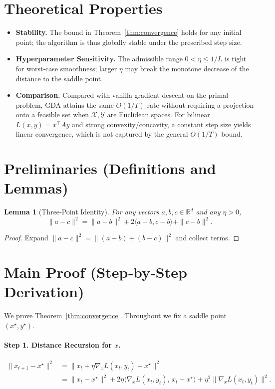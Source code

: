 \documentclass{article}
\newtheorem{lemma}{Lemma}
\begin{document}
\section*{Theoretical Properties}
\begin{itemize}[leftmargin=*]
\item \textbf{Stability.} The bound in Theorem~\ref{thm:convergence} holds for any initial point; the algorithm is thus globally stable under the prescribed step size.
\item \textbf{Hyperparameter Sensitivity.} The admissible range $0<\eta\le 1/L$ is tight for worst‑case smoothness; larger $\eta$ may break the monotone decrease of the distance to the saddle point.
\item \textbf{Comparison.} Compared with vanilla gradient descent on the primal problem, GDA attains the same $O(1/T)$ rate without requiring a projection onto a feasible set when $\mathcal X,\mathcal Y$ are Euclidean spaces. For bilinear $L(x,y)=x^\top Ay$ and strong convexity/concavity, a constant step size yields linear convergence, which is not captured by the general $O(1/T)$ bound.
\end{itemize}

\section*{Preliminaries (Definitions and Lemmas)}
\begin{lemma}[Three‑Point Identity]\label{lem:three}
For any vectors $a,b,c\in\mathbb R^d$ and any $\eta>0$,
\[
\|a-c\|^2 = \|a-b\|^2 + 2\langle a-b,c-b\rangle + \|c-b\|^2.
\]
\end{lemma}
\begin{proof}
Expand $\|a-c\|^2=\|(a-b)+(b-c)\|^2$ and collect terms. \qedhere
\end{proof}

\section*{Main Proof (Step‑by‑Step Derivation)}
We prove Theorem~\ref{thm:convergence}. Throughout we fix a saddle point $(x^\star,y^\star)$.

\paragraph{Step 1. Distance Recursion for $x$.}
\begin{align}
\|x_{t+1}-x^\star\|^2
&= \|x_t +\eta\nabla_x L(x_t,y_t)-x^\star\|^2 \nonumber\\
&= \|x_t-x^\star\|^2 + 2\eta\langle\nabla_x L(x_t,y_t),\,x_t-x^\star\rangle
   +\eta^2\|\nabla_x L(x_t,y_t)\|^2. \tag{1}
\end{align}
\end{document}
